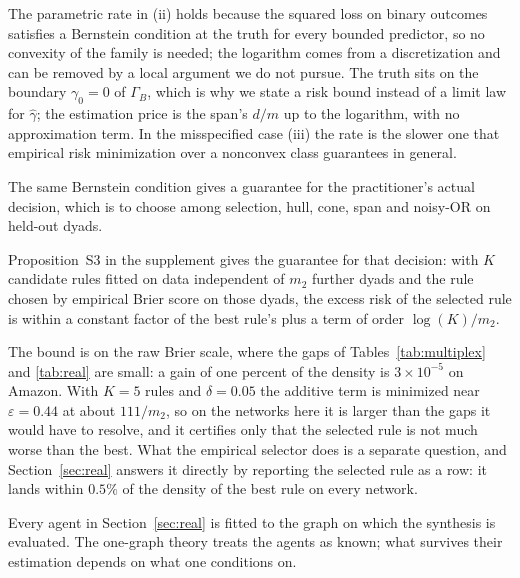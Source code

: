 \documentclass[12pt]{article}
\begin{document}
The parametric rate in (ii) holds because the squared loss on binary outcomes satisfies a Bernstein condition at the truth for every bounded predictor, so no convexity of the family is needed; the logarithm comes from a discretization and can be removed by a local argument we do not pursue. The truth sits on the boundary $\gamma_0=0$ of $\Gamma_B$, which is why we state a risk bound instead of a limit law for $\hat\gamma$; the estimation price is the span's $d/m$ up to the logarithm, with no approximation term. In the misspecified case (iii) the rate is the slower one that empirical risk minimization over a nonconvex class guarantees in general.

The same Bernstein condition gives a guarantee for the practitioner's actual decision, which is to choose among selection, hull, cone, span and noisy-OR on held-out dyads.

Proposition~S3 in the supplement gives the guarantee for that decision: with $K$ candidate rules fitted on data independent of $m_2$ further dyads and the rule chosen by empirical Brier score on those dyads, the excess risk of the selected rule is within a constant factor of the best rule's plus a term of order $\log(K)/m_2$.

The bound is on the raw Brier scale, where the gaps of Tables~\ref{tab:multiplex} and \ref{tab:real} are small: a gain of one percent of the density is $3\times10^{-5}$ on Amazon. With $K=5$ rules and $\delta=0.05$ the additive term is minimized near $\varepsilon=0.44$ at about $111/m_2$, so on the networks here it is larger than the gaps it would have to resolve, and it certifies only that the selected rule is not much worse than the best. What the empirical selector does is a separate question, and Section~\ref{sec:real} answers it directly by reporting the selected rule as a row: it lands within $0.5\%$ of the density of the best rule on every network.

Every agent in Section~\ref{sec:real} is fitted to the graph on which the synthesis is evaluated. The one-graph theory treats the agents as known; what survives their estimation depends on what one conditions on.
\end{document}
